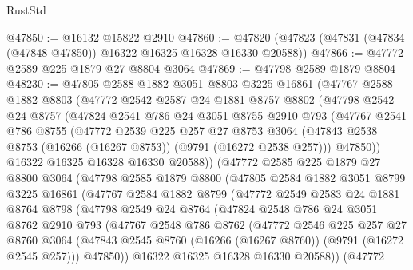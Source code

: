 \begin{lexlean}{RustStd}
\begin{coremodule}
@47850 := @16132 @15822 @2910
@47860 := @47820 (@47823 (@47831 (@47834 (@47848 @47850)) @16322 @16325 @16328 @16330 @20588))
@47866 := @47772 @2589 @225 @1879 @27 @8804 @3064
@47869 := @47798 @2589 @1879 @8804
@48230 := @47805
    @2588
    @1882
    @3051
    @8803
    @3225
    @16861
    (@47767
      @2588
      @1882
      @8803
      (@47772
        @2542
        @2587
        @24
        @1881
        @8757
        @8802
        (@47798
          @2542
          @24
          @8757
          (@47824
            @2541
            @786
            @24
            @3051
            @8755
            @2910
            @793
            (@47767
              @2541
              @786
              @8755
              (@47772
                @2539
                @225
                @257
                @27
                @8753
                @3064
                (@47843 @2538 @8753 (@16266 (@16267 @8753)) (@9791 (@16272 @2538 @257)))
                @47850))
            @16322
            @16325
            @16328
            @16330
            @20588))
        (@47772
          @2585
          @225
          @1879
          @27
          @8800
          @3064
          (@47798
            @2585
            @1879
            @8800
            (@47805
              @2584
              @1882
              @3051
              @8799
              @3225
              @16861
              (@47767
                @2584
                @1882
                @8799
                (@47772
                  @2549
                  @2583
                  @24
                  @1881
                  @8764
                  @8798
                  (@47798
                    @2549
                    @24
                    @8764
                    (@47824
                      @2548
                      @786
                      @24
                      @3051
                      @8762
                      @2910
                      @793
                      (@47767
                        @2548
                        @786
                        @8762
                        (@47772
                          @2546
                          @225
                          @257
                          @27
                          @8760
                          @3064
                          (@47843 @2545 @8760 (@16266 (@16267 @8760)) (@9791 (@16272 @2545 @257)))
                          @47850))
                      @16322
                      @16325
                      @16328
                      @16330
                      @20588))
                  (@47772

\end{coremodule}
\end{lexlean}
